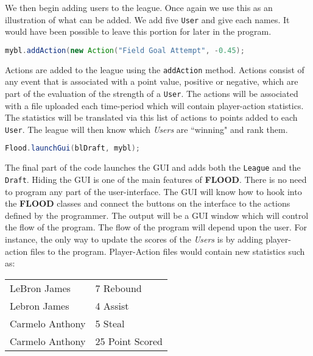 \documentclass[12pt]{report}
\begin{document}
We then begin adding users to the league. Once again we use this as an illustration of what can be added. We add five \texttt{User} and give each names. It would have been possible to leave this portion for later in the program.

\begin{singlespace}
\begin{lstlisting}[language=Java,label=some-code,caption=Adding a new Action]
mybl.addAction(new Action("Field Goal Attempt", -0.45);
\end{lstlisting}
\end{singlespace}

Actions are added to the league using the \texttt{addAction} method. Actions consist of any event that is associated with a point value, positive or negative, which are part of the evaluation of the strength of a \texttt{User}. The actions will be associated with a file uploaded each time-period which will contain player-action statistics. The statistics will be translated via this list of actions to points added to each \texttt{User}. The league will then know which \textit{Users} are ``winning" and rank them. 

\begin{singlespace}
\begin{lstlisting}[language=Java,label=some-code,caption=Launching the GUI]
Flood.launchGui(blDraft, mybl);
\end{lstlisting}
\end{singlespace}

The final part of the code launches the GUI and adds both the \texttt{League} and the \texttt{Draft}. Hiding the GUI is one of the main features of \textbf{FLOOD}. There is no need to program any part of the user-interface. The GUI will know how to hook into the \textbf{FLOOD} classes and connect the buttons on the interface to the actions defined by the programmer. The output will be a GUI window which will control the flow of the program. The flow of the program will depend upon the user. For instance, the only way to update the scores of the \textit{Users} is by adding player-action files to the program. Player-Action files would contain new statistics such as:
\begin{center}
\begin{singlespace}
\begin{tabular}{ l l }
LeBron James & 7 Rebound \\
Lebron James & 4 Assist \\
Carmelo Anthony & 5 Steal \\
Carmelo Anthony & 25 Point Scored
\end{tabular}
\end{singlespace}
\end{center}
\end{document}

